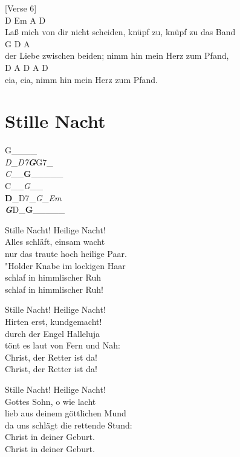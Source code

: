 \documentclass[
  letterpaper,
]{scrbook}
\begin{document}
{[}Verse 6{]}\\
D Em A D\\
Laß mich von dir nicht scheiden, knüpf zu, knüpf zu das Band\\
G D A\\
der Liebe zwischen beiden; nimm hin mein Herz zum Pfand,\\
D A D A D\\
eia, eia, nimm hin mein Herz zum Pfand.

\hypertarget{stille-nacht}{%
\chapter{Stille Nacht}\label{stille-nacht}}

G\_\textbf{\textbar{}}\_\emph{\textbar{}}\_\textbf{\textbar{}}\_\emph{\textbar{}\\
D}\_\emph{\textbar D7\textbf{\textbar G}}\textbar G7\_\emph{\textbar{}\\
C}\_\emph{\textbar{}}\_\textbf{\textbar G}\_\textbar\_\_\_\_\textbar{}\\
C\_\textbf{\textbar{}}\_\emph{\textbar G}\_\emph{\textbar{}}\_\textbf{\textbar{}\\
D}\_\textbar D7\_\emph{\textbar G}\_\emph{\textbar Em\textbf{\textbar{}\\
G}}\textbar D\_\textbf{\textbar G}\_\textbar\_\_\_\_\textbar{}

Stille Nacht! Heilige Nacht!\\
Alles schläft, einsam wacht\\
nur das traute hoch heilige Paar.\\
"Holder Knabe im lockigen Haar\\
schlaf in himmlischer Ruh\textquotesingle{}\\
schlaf in himmlischer Ruh\textquotesingle!

Stille Nacht! Heilige Nacht!\\
Hirten erst, kundgemacht!\\
durch der Engel Halleluja\\
tönt es laut von Fern\textquotesingle{} und Nah:\\
Christ, der Retter ist da!\\
Christ, der Retter ist da!

Stille Nacht! Heilige Nacht!\\
Gottes Sohn, o wie lacht\\
lieb\textquotesingle{} aus deinem göttlichen Mund\\
da uns schlägt die rettende Stund\textquotesingle:\\
Christ in deiner Geburt.\\
Christ in deiner Geburt.
\end{document}
